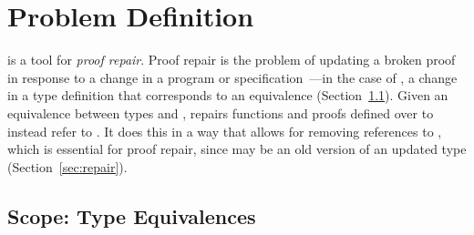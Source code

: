 \section{Problem Definition}
\label{sec:key1}

\toolname is a tool for \textit{proof repair}.
Proof repair is the problem of updating a broken proof in response to a change in a program or specification~\cite{PGL-045, pumpkinpatch}---in the
case of \toolname, a change in a type definition that corresponds to an equivalence (Section~\ref{sec:scope}).
Given an equivalence between types \A and \B,
\toolname repairs functions and proofs defined over \A to instead refer to \B.
It does this in a way that allows for removing references to \A, which is essential for proof repair,
since \A may be an old version of an updated type (Section~\ref{sec:repair}).



\subsection{Scope: Type Equivalences}
\label{sec:scope}

